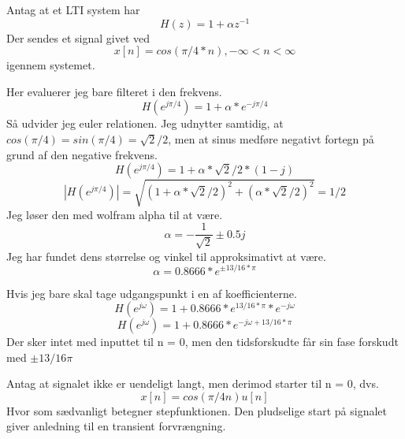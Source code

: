\begin{rubrik}
\begin{eksamensOpgave}
\begin{UnderOpgave}
        \end{UnderOpgave}
    \end{eksamensOpgave}
    \begin{eksamensOpgave}
        Antag at et LTI system har 
        \[H(z) = 1 + \alpha z^{-1}\]
        Der sendes et signal givet ved 
        \[x[n] = cos(\pi/4 * n), -\infty < n < \infty\]
        igennem systemet. 
        \begin{UnderOpgave}
            Her evaluerer jeg bare filteret i den frekvens. 
            \[H(e^{j\pi/4}) = 1 + \alpha * e^{-j\pi/4}\]
            Så udvider jeg euler relationen. Jeg udnytter samtidig, at $cos(\pi/4) = sin(\pi/4) = \sqrt{2}/2$, men at sinus medføre negativt fortegn på grund af den negative frekvens.
            \[H(e^{j\pi/4}) = 1 + \alpha * \sqrt{2}/2 * (1 - j)\]
            \[|H(e^{j\pi/4})| = \sqrt{(1 + \alpha * \sqrt{2}/2)^2 + (\alpha * \sqrt{2}/2)^2} = 1/2\]
            Jeg løser den med wolfram alpha til at være. 
            \[\alpha = -\frac{1}{\sqrt{2}} \pm 0.5j\]
            Jeg har fundet dens størrelse og vinkel til approksimativt at være.
            \[\alpha = 0.8666 * e^{\pm 13/16*\pi}\]
        \end{UnderOpgave}
        \begin{UnderOpgave}
            Hvis jeg bare skal tage udgangspunkt i en af koefficienterne.
            \[H(e^{j\omega}) = 1 + 0.8666 * e^{13/16*\pi} * e^{-j\omega}\]
            \[H(e^{j\omega}) = 1 + 0.8666 * e^{-j\omega + 13/16*\pi}\]
            Der sker intet med inputtet til n = 0, men den tidsforskudte får sin fase forskudt med $\pm 13/16\pi$               
        \end{UnderOpgave}
        Antag at signalet ikke er uendeligt langt, men derimod starter til n = 0, dvs.
        \[x[n] = cos(\pi/4 n )u[n]\]
        Hvor  som sædvanligt betegner stepfunktionen. Den pludselige start på signalet giver anledning til en transient forvrængning. 
        \begin{UnderOpgave}
            
        \end{UnderOpgave}
        
    \end{eksamensOpgave}
    \begin{eksamensOpgave}
        \begin{UnderOpgave}
            

\end{UnderOpgave}
\end{eksamensOpgave}
\end{rubrik}
